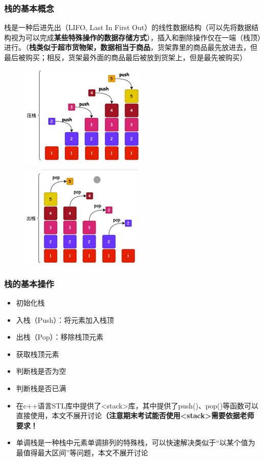 \documentclass[UTF8]{ctexart}
\begin{document}
\subsubsection{栈的基本概念}
栈是一种后进先出（LIFO, Last In First Out）的线性数据结构（可以先将数据结构视为可以完成\textbf{某些特殊操作的数据存储方式}），插入和删除操作仅在一端（栈顶）进行。（\textbf{栈类似于超市货物架，数据相当于商品}，货架靠里的商品最先放进去，但最后被购买；相反，货架最外面的商品最后被放到货架上，但是最先被购买）
\begin{figure}[htbp]
	\centering
	\begin{minipage}{0.49\linewidth}
		\centering
		\includegraphics{picture/1.jpg}
	\end{minipage}
	\begin{minipage}{0.49\linewidth}
		\centering
		\includegraphics{picture/2.jpg}
	\end{minipage}
\end{figure}
\subsubsection{栈的基本操作}
\begin{itemize}
\item 初始化栈
\item 入栈（Push）：将元素加入栈顶
\item 出栈（Pop）：移除栈顶元素
\item 获取栈顶元素
\item 判断栈是否为空
\item 判断栈是否已满

\item 在c++语言STL库中提供了<stack>库，其中提供了push()、pop()等函数可以直接使用，本文不展开讨论\textbf{（注意期末考试能否使用\textless{}stack\textgreater{}需要依据老师要求！}
\item 单调栈是一种栈中元素单调排列的特殊栈，可以快速解决类似于“以某个值为最值得最大区间”等问题，本文不展开讨论
\end{itemize}
\end{document}
